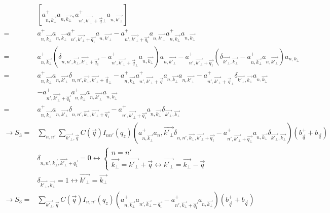 \documentclass{article}
\begin{document}
\begin{align*}
    & \left[a^+_{n, \vec{k_\bot}}a_{n, \vec{k_\bot}},a^+_{{n'}, \vec{k'_\bot}+ \vec{q}\bot} a_{n, \vec{k'_\bot}}\right] \\
    = & a^+_{n, \vec{k_\bot}} a_{n, \vec{k_\bot}} a^+_{{n'}, \vec{k'_\bot}+\vec{q_1}} a_{n, \vec{k'_\bot}} - a^+_{{n'}, \vec{k'_\bot}+ \vec{q_1}} a_{n, \vec{k'_\bot}} a^+_{n, \vec{k_\bot}} a_{n, \vec{k_\bot}}\\
    = &a^+_{n, \vec{k_\bot}} \left(\delta_{n,n',\vec{k_\bot},\vec{k'_\bot}+\vec{q_1}}-a^+_{{n'}, \vec{k'_\bot}+ \vec{q}_\bot}a_{n,\vec{k_\bot}}\right)a_{n, \vec{k'_\bot}}-a^+_{n', \vec{k'_\bot}+ \vec{q_1}}\left(\delta_{\vec{k'_\bot}, \vec{k_\bot}}-a^+_{n,\vec{k_\bot}}a_{n,\vec{k'_\bot}}\right)a_{n,k_\bot} \\
    = & a^+_{n, \vec{k_\bot}} a_{n, \vec{k'_\bot}}\delta_{n,n', \vec{k_\bot}, \vec{k'_\bot} + \vec{q}_\bot}- a^+_{n, \vec{k_\bot}} a^+_{n', \vec{k'_\bot} + \vec{q}} a_{n, \vec{k_\bot}} a_{n, \vec{k'_\bot}} - a^+_{n', \vec{k'_\bot} + \vec{q}_\bot} \delta_{ \vec{k'_\bot}, \vec{k_\bot}} a_{n,\vec{k_\bot}} \\
    &  - a^+_{n', \vec{k'_\bot} + \vec{q_1}} a^+_{n, \vec{k_\bot}}a_{n, \vec{k'_\bot}}a_{n, \vec{k_\bot}}\\
    = & a^+_{n, \vec{k_\bot}}a_{n, \vec{k'_\bot}} \delta_{n,n', \vec{k_\bot}, \vec{k'_\bot} + \vec{q_1}} - a^+_{n', \vec{k'_\bot} + \vec{q_1}} a_{n, \vec{k_\bot}}\delta_{\vec{k'_\bot}, \vec{k_\bot}}\\   
    \rightarrow S_3 =& \sum_{n,n'} \sum_{\vec{k'_\bot},\vec{q}} C\left(\vec{q}\right) I_{nn'} \left(q_z\right) \left(a^+_{n, \vec{k_\bot}}a_n, \vec{k'_\bot} \delta_{n,n', \vec{k_\bot}, \vec{k'_\bot} + \vec{q_1}} - a^+_{n', \vec{k'_\bot} + \vec{q_\bot }} a_{n, \vec{k_\bot}}\delta_{\vec{k'_\bot}, \vec{k_\bot}}\right)\left(b^+_{\vec{q}}+ b_{\vec{q}}\right)\\
    & \delta_{n,n', \vec{k_\bot},\vec{k'_\bot}+\vec{q_1}}=0 \leftrightarrow \begin{cases}
        n = n'\\
        \vec{k_\bot} = \vec{k'_\bot} + \vec{q} \leftrightarrow \vec{k'_\bot} = \vec{k_\bot} - \vec{q}
    \end{cases} \\
    & \delta_{\vec{k'_\bot}, \vec{k_\bot}} = 1 \leftrightarrow \vec{k'_\bot} = \vec{k_\bot} \\
    \rightarrow S_3 = & \sum_{\vec{k'_\bot},\vec{q}}C\left(\vec{q}\right) I_{n,n'} \left(q_z\right) \left(a^+_{n,\vec{k_\bot}}a_{n', \vec{k_\bot} -\vec{q_1}} - a^+_{n', \vec{k_\bot}+ \vec{q_1}}a_{n, \vec{k_\bot}}\right)\left(b^+_{\vec{q}}+ b_{\vec{q}}\right) \\

\end{align*}
\end{document}
